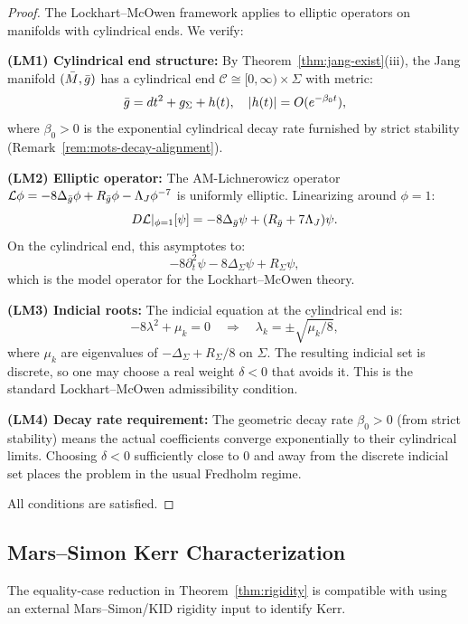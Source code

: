 \begin{proof}
The Lockhart--McOwen framework applies to elliptic operators on manifolds with cylindrical ends. We verify:

\textbf{(LM1) Cylindrical end structure:} By Theorem~\ref{thm:jang-exist}(iii), the Jang manifold $(\bar{M}, \bar{g})$ has a cylindrical end $\mathcal{C} \cong [0,\infty) \times \Sigma$ with metric:
\[
\bar{g} = dt^2 + g_\Sigma + h(t), \quad |h(t)| = O(e^{-\beta_0 t}),
\]
where $\beta_0>0$ is the exponential cylindrical decay rate furnished by strict stability (Remark~\ref{rem:mots-decay-alignment}).

\textbf{(LM2) Elliptic operator:} The AM-Lichnerowicz operator $\mathcal{L}\phi = -8\Delta_{\bar{g}}\phi + R_{\bar{g}}\phi - \Lambda_J\phi^{-7}$ is uniformly elliptic. Linearizing around $\phi = 1$:
\[
D\mathcal{L}|_{\phi=1}[\psi] = -8\Delta_{\bar{g}}\psi + (R_{\bar{g}} + 7\Lambda_J)\psi.
\]
On the cylindrical end, this asymptotes to:
\[
-8\partial_t^2\psi - 8\Delta_\Sigma\psi + R_\Sigma\psi,
\]
which is the model operator for the Lockhart--McOwen theory.

\textbf{(LM3) Indicial roots:} The indicial equation at the cylindrical end is:
\[
-8\lambda^2 + \mu_k = 0 \quad \Rightarrow \quad \lambda_k = \pm\sqrt{\mu_k/8},
\]
where $\mu_k$ are eigenvalues of $-\Delta_\Sigma + R_\Sigma/8$ on $\Sigma$. The resulting indicial set is discrete, so one may choose a real weight $\delta<0$ that avoids it. This is the standard Lockhart--McOwen admissibility condition.

\textbf{(LM4) Decay rate requirement:} The geometric decay rate $\beta_0>0$ (from strict stability) means the actual coefficients converge exponentially to their cylindrical limits. Choosing $\delta<0$ sufficiently close to $0$ and away from the discrete indicial set places the problem in the usual Fredholm regime.

All conditions are satisfied. \qedhere
\end{proof}

\subsection{Mars--Simon Kerr Characterization}

\begin{proposition}\label{prop:mars-compat}
The equality-case reduction in Theorem~\ref{thm:rigidity} is compatible with using an external Mars--Simon/KID rigidity input to identify Kerr.
\end{proposition}

